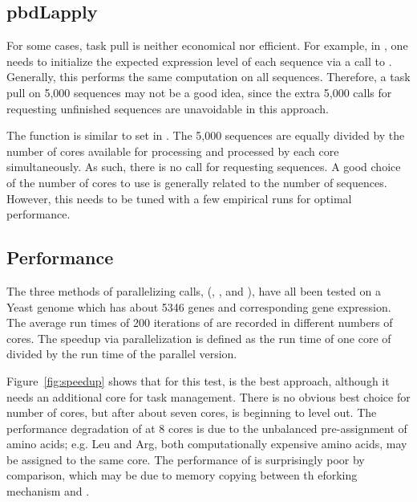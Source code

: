 \subsection[pbdLapply]{pbdLapply}
\label{sec:pbdLapply}

For some cases, task pull is neither economical nor efficient. For example, in
, one needs to initialize the expected expression level of each 
sequence via a call to . Generally, this performs the 
same computation on all sequences. Therefore, a task pull on 5,000
sequences may not be a good idea, since the extra 5,000 calls for requesting 
unfinished sequences are unavoidable in this approach.

The function  is similar to set 
in . The 5,000 sequences are equally divided by the number of 
cores available for processing and processed by each core simultaneously. 
As such, there is no call for requesting sequences. A good 
choice of the number of cores to use is generally related to the number of 
sequences. However, this needs to be tuned with a few empirical runs for 
optimal performance.


\subsection[Performance]{Performance}
\label{sec:performance}

The three methods of parallelizing  calls,  
(, , and
), have all been tested on a Yeast genome which has about 
5346 genes and corresponding gene expression. The average run times of 200 
iterations of  are recorded in different numbers of cores. 
The speedup via parallelization is defined as the run time of one core of 
 divided by the run time of the parallel version.

Figure~\ref{fig:speedup} shows that for this test,  is the 
best approach, although it needs an additional core for task management. 
There is no obvious best choice for number of cores, but after about seven 
cores,  is beginning to level out.  The 
performance degradation of  at 8 cores is due to the 
unbalanced pre-assignment of amino acids; e.g. Leu and Arg, both 
computationally expensive amino acids, may be assigned to the same core.
The performance of  is surprisingly poor by comparison, which 
may be due to memory copying between th eforking mechanism and 
. 


